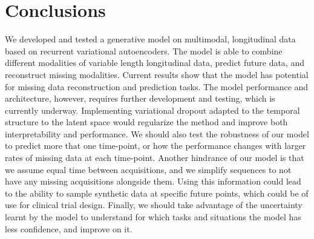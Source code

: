 \section{Conclusions}
\label{rnn:conclusions}

We developed and tested a generative model on multimodal, longitudinal data based on recurrent variational autoencoders. The model is able to combine different modalities of variable length longitudinal data, predict future data, and reconstruct missing modalities. Current results show that the model has potential for missing data reconstruction and prediction tasks. The model performance and architecture, however, requires further development and testing, which is currently underway. Implementing variational dropout adapted to the temporal structure to the latent space would regularize the method and improve both interpretability and performance. We should also test the robustness of our model to predict more that one time-point, or how the performance changes with larger rates of missing data at each time-point. Another hindrance of our model is that we assume equal time between acquisitions, and we simplify sequences to not have any missing acquisitions alongside them. Using this information could lead to the ability to sample synthetic data at specific future points, which could be of use for clinical trial design. Finally, we should take advantage of the uncertainty learnt by the model to understand for which tasks and situations the model has less confidence, and improve on it.  \\